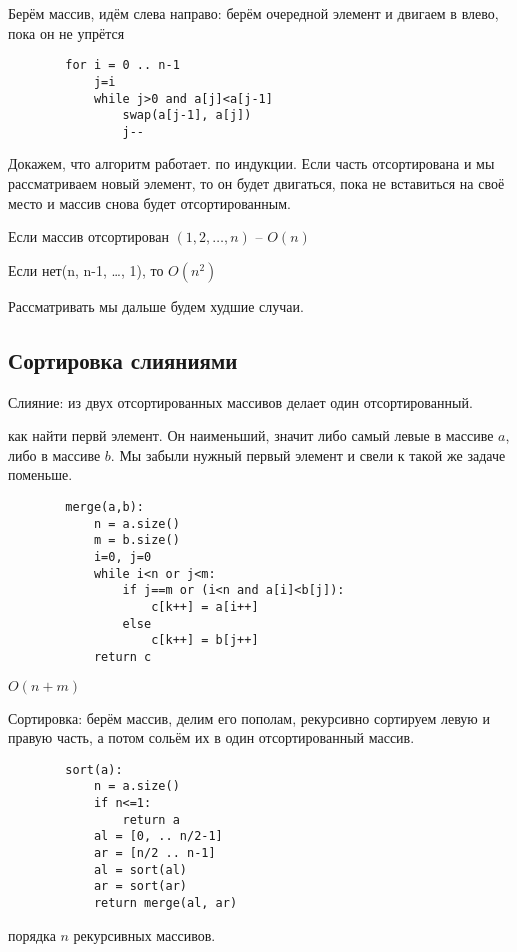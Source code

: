 \documentclass{book}
\theoremstyle{definition}
\begin{document}
    Берём массив, идём слева направо: берём очередной элемент и двигаем в влево, пока он не упрётся

    \begin{verbatim}
        for i = 0 .. n-1
            j=i
            while j>0 and a[j]<a[j-1]
                swap(a[j-1], a[j])
                j--
    \end{verbatim}

    Докажем, что алгоритм работает. по индукции. Если часть отсортирована и мы рассматриваем новый элемент, то он будет двигаться, пока не вставиться на своё место и массив снова будет отсортированным.

    Если массив отсортирован $(1,2,\ldots, n)$ -- $O(n)$

    Если нет(n, n-1, \ldots, 1), то $O(n^2)$

    Рассматривать мы дальше будем худшие случаи.

    \subsection{Сортировка слияниями}

    Слияние: из двух отсортированных массивов делает один отсортированный.

   как найти первй элемент. Он наименьший, значит либо самый левые в массиве $a$, либо в массиве $b$. Мы забыли нужный первый элемент и свели к такой же задаче поменьше.

    \begin{verbatim}
        merge(a,b):
            n = a.size()
            m = b.size()
            i=0, j=0
            while i<n or j<m:
                if j==m or (i<n and a[i]<b[j]):
                    c[k++] = a[i++]
                else
                    c[k++] = b[j++]
            return c
    \end{verbatim}
    $O(n+m)$

    Сортировка: берём массив, делим его пополам, рекурсивно сортируем левую и правую часть, а потом сольём их в один отсортированный массив.

    \begin{verbatim}
        sort(a):
            n = a.size()
            if n<=1:
                return a
            al = [0, .. n/2-1]
            ar = [n/2 .. n-1]
            al = sort(al)
            ar = sort(ar)
            return merge(al, ar)
    \end{verbatim}

    порядка $n$ рекурсивных массивов.
\end{document}
